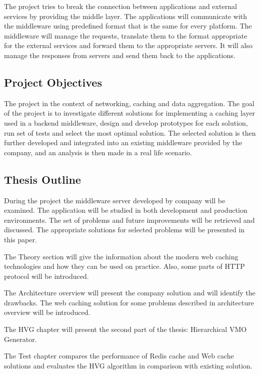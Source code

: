 The project tries to break the connection between applications and external services by providing the middle layer. The applications will communicate with the middleware using predefined format that is the same for every platform. The middleware will manage the requests, translate them to the format appropriate for the external services and forward them to the appropriate servers. It will also manage the responses from servers and send them back to the applications.


\subsection{Project Objectives}

The project in the context of networking, caching and data aggregation. The goal of the project is to investigate different solutions for implementing a caching layer used in a backend middleware, design and develop prototypes for each solution, run set of tests and select the most optimal solution.
The selected solution is then further developed and integrated into an existing middleware provided by the company, and an analysis is then made in a real life scenario.


\subsection{Thesis Outline}

During the project the middleware server developed by company will be examined. The application will be studied in both development and production environments. The set of problems and future improvements will be retrieved and discussed. The appropriate solutions for selected problems will be presented in this paper.

The Theory section will give the information about the modern web caching technologies and how they can be used on practice. Also, some parts of HTTP protocol will be introduced.

The Architecture overview will present the company solution and will identify the drawbacks. The web caching solution for some problems described in architecture overview will be introduced.

The HVG chapter will present the second part of the thesis: Hierarchical VMO Generator.

The Test chapter compares the performance of Redis cache and Web cache solutions and evaluates the HVG algorithm in comparison with existing solution.

\newpage

